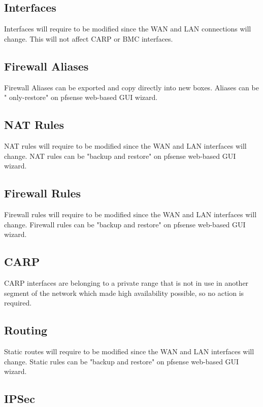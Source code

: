 \subsection{Interfaces}

Interfaces will require to be modified since the WAN and LAN connections will change. This will not affect CARP or BMC interfaces.

\subsection{Firewall Aliases}

Firewall Aliases can be exported and copy directly into new boxes. Aliases can be " only-restore" on pfsense web-based GUI wizard. 

\subsection{NAT Rules}

NAT rules will require to be modified since the WAN and LAN interfaces will change. NAT rules can be "backup and restore" on pfsense web-based GUI wizard.

\subsection{Firewall Rules}

Firewall rules will require to be modified since the WAN and LAN interfaces will change. Firewall rules can be "backup and restore" on pfsense web-based GUI wizard.

\subsection{CARP}

CARP interfaces are belonging to a private range that is not in use in another segment of the network which made high availability possible, so no action is required.

\subsection{Routing}

Static routes will require to be modified since the WAN and LAN interfaces will change. Static rules can be "backup and restore" on pfsense web-based GUI wizard.

\subsection{IPSec}

